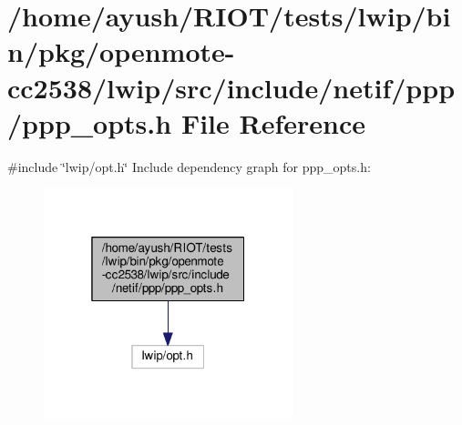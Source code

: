 \hypertarget{openmote-cc2538_2lwip_2src_2include_2netif_2ppp_2ppp__opts_8h}{}\section{/home/ayush/\+R\+I\+O\+T/tests/lwip/bin/pkg/openmote-\/cc2538/lwip/src/include/netif/ppp/ppp\+\_\+opts.h File Reference}
\label{openmote-cc2538_2lwip_2src_2include_2netif_2ppp_2ppp__opts_8h}
{\ttfamily \#include \char`\"{}lwip/opt.\+h\char`\"{}}\newline
Include dependency graph for ppp\+\_\+opts.\+h\+:
\nopagebreak
\begin{figure}[H]
\begin{center}
\leavevmode
\includegraphics[width=205pt]{openmote-cc2538_2lwip_2src_2include_2netif_2ppp_2ppp__opts_8h__incl}
\end{center}
\end{figure}
